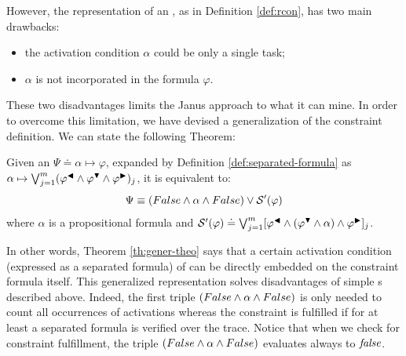 However, the representation of an \rcon\xspace, as in Definition \ref{def:rcon}, has two main drawbacks:
\begin{itemize}
\item  the activation condition $\alpha$ could be only a single task;
\item $\alpha$ is not incorporated in the formula $\varphi$.
\end{itemize}
These two disadvantages limits the Janus approach to what it can mine. In order to overcome this limitation, we have devised a generalization of the \rcon\xspace constraint definition. We can state the following Theorem:
\begin{theorem}\label{th:gener-theo}
Given an \rcon\xspace $\Psi \doteq \alpha  \mapsto \varphi$, expanded by Definition \ref{def:separated-formula} as $\alpha  \mapsto \bigvee^{m}_{j=1} (\varphi^{\blacktriangleleft} \wedge \varphi^{\blacktriangledown} \wedge \varphi^{\blacktriangleright})_j$, it is equivalent to:
\begin{equation}\label{eq:new-constraint}
\Psi \equiv (False \wedge \alpha \wedge False) \vee \mathcal{S}'(\varphi)
\end{equation}
where $\alpha$ is a propositional formula and $\mathcal{S}'(\varphi) \doteq \bigvee^{m}_{j=1} [\varphi^{\blacktriangleleft} \wedge (\varphi^{\blacktriangledown} \wedge \alpha) \wedge \varphi^{\blacktriangleright}]_j$.
\end{theorem}
In other words, Theorem \ref{th:gener-theo} says that a certain activation condition (expressed as a separated formula) of \rcon\xspace can be directly embedded on the constraint formula itself. This generalized representation solves disadvantages of simple \rcon s\xspace described above. Indeed, the first triple $(False \wedge \alpha \wedge False)$ is only needed to count all occurrences of activations whereas the constraint is fulfilled if for at least a separated formula is verified over the trace. Notice that when we check for constraint fulfillment, the triple $(False \wedge \alpha \wedge False)$ evaluates always to $\mathit{false}$.

